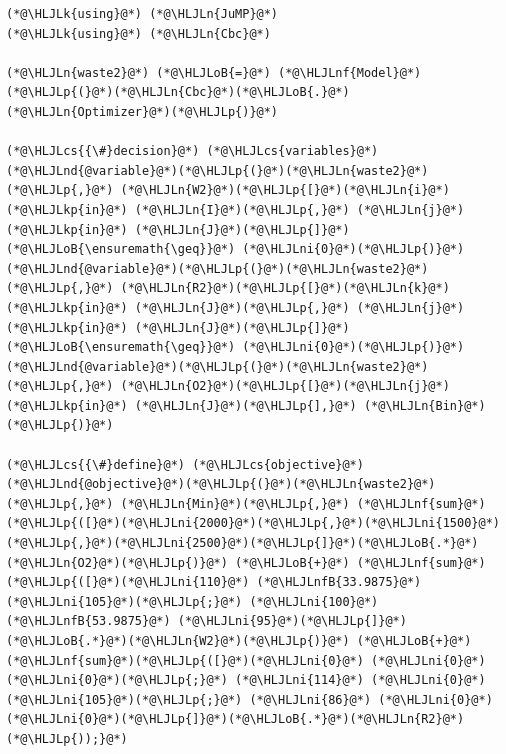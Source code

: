 \documentclass[12pt,a4paper]{article}
\newcommand{\HLJLk}[1]{\textcolor[RGB]{148,91,176}{\textbf{#1}}}
\newcommand{\HLJLkp}[1]{\textcolor[RGB]{148,91,176}{\textbf{#1}}}
\newcommand{\HLJLn}[1]{#1}
\newcommand{\HLJLnd}[1]{\textcolor[RGB]{214,102,97}{#1}}
\newcommand{\HLJLnf}[1]{\textcolor[RGB]{66,102,213}{#1}}
\newcommand{\HLJLnfB}[1]{\textcolor[RGB]{59,151,46}{#1}}
\newcommand{\HLJLni}[1]{\textcolor[RGB]{59,151,46}{#1}}
\newcommand{\HLJLoB}[1]{\textcolor[RGB]{102,102,102}{\textbf{#1}}}
\newcommand{\HLJLp}[1]{#1}
\newcommand{\HLJLcs}[1]{\textcolor[RGB]{153,153,119}{\textit{#1}}}
\begin{document}
\begin{lstlisting}
(*@\HLJLk{using}@*) (*@\HLJLn{JuMP}@*)
(*@\HLJLk{using}@*) (*@\HLJLn{Cbc}@*)

(*@\HLJLn{waste2}@*) (*@\HLJLoB{=}@*) (*@\HLJLnf{Model}@*)(*@\HLJLp{(}@*)(*@\HLJLn{Cbc}@*)(*@\HLJLoB{.}@*)(*@\HLJLn{Optimizer}@*)(*@\HLJLp{)}@*)

(*@\HLJLcs{{\#}decision}@*) (*@\HLJLcs{variables}@*)
(*@\HLJLnd{@variable}@*)(*@\HLJLp{(}@*)(*@\HLJLn{waste2}@*)(*@\HLJLp{,}@*) (*@\HLJLn{W2}@*)(*@\HLJLp{[}@*)(*@\HLJLn{i}@*) (*@\HLJLkp{in}@*) (*@\HLJLn{I}@*)(*@\HLJLp{,}@*) (*@\HLJLn{j}@*) (*@\HLJLkp{in}@*) (*@\HLJLn{J}@*)(*@\HLJLp{]}@*) (*@\HLJLoB{\ensuremath{\geq}}@*) (*@\HLJLni{0}@*)(*@\HLJLp{)}@*)
(*@\HLJLnd{@variable}@*)(*@\HLJLp{(}@*)(*@\HLJLn{waste2}@*)(*@\HLJLp{,}@*) (*@\HLJLn{R2}@*)(*@\HLJLp{[}@*)(*@\HLJLn{k}@*) (*@\HLJLkp{in}@*) (*@\HLJLn{J}@*)(*@\HLJLp{,}@*) (*@\HLJLn{j}@*) (*@\HLJLkp{in}@*) (*@\HLJLn{J}@*)(*@\HLJLp{]}@*) (*@\HLJLoB{\ensuremath{\geq}}@*) (*@\HLJLni{0}@*)(*@\HLJLp{)}@*)
(*@\HLJLnd{@variable}@*)(*@\HLJLp{(}@*)(*@\HLJLn{waste2}@*)(*@\HLJLp{,}@*) (*@\HLJLn{O2}@*)(*@\HLJLp{[}@*)(*@\HLJLn{j}@*) (*@\HLJLkp{in}@*) (*@\HLJLn{J}@*)(*@\HLJLp{],}@*) (*@\HLJLn{Bin}@*)(*@\HLJLp{)}@*)

(*@\HLJLcs{{\#}define}@*) (*@\HLJLcs{objective}@*)
(*@\HLJLnd{@objective}@*)(*@\HLJLp{(}@*)(*@\HLJLn{waste2}@*)(*@\HLJLp{,}@*) (*@\HLJLn{Min}@*)(*@\HLJLp{,}@*) (*@\HLJLnf{sum}@*)(*@\HLJLp{([}@*)(*@\HLJLni{2000}@*)(*@\HLJLp{,}@*)(*@\HLJLni{1500}@*)(*@\HLJLp{,}@*)(*@\HLJLni{2500}@*)(*@\HLJLp{]}@*)(*@\HLJLoB{.*}@*)(*@\HLJLn{O2}@*)(*@\HLJLp{)}@*) (*@\HLJLoB{+}@*) (*@\HLJLnf{sum}@*)(*@\HLJLp{([}@*)(*@\HLJLni{110}@*) (*@\HLJLnfB{33.9875}@*) (*@\HLJLni{105}@*)(*@\HLJLp{;}@*) (*@\HLJLni{100}@*) (*@\HLJLnfB{53.9875}@*) (*@\HLJLni{95}@*)(*@\HLJLp{]}@*)(*@\HLJLoB{.*}@*)(*@\HLJLn{W2}@*)(*@\HLJLp{)}@*) (*@\HLJLoB{+}@*) (*@\HLJLnf{sum}@*)(*@\HLJLp{([}@*)(*@\HLJLni{0}@*) (*@\HLJLni{0}@*) (*@\HLJLni{0}@*)(*@\HLJLp{;}@*) (*@\HLJLni{114}@*) (*@\HLJLni{0}@*) (*@\HLJLni{105}@*)(*@\HLJLp{;}@*) (*@\HLJLni{86}@*) (*@\HLJLni{0}@*) (*@\HLJLni{0}@*)(*@\HLJLp{]}@*)(*@\HLJLoB{.*}@*)(*@\HLJLn{R2}@*)(*@\HLJLp{));}@*)


\end{lstlisting}
\end{document}
